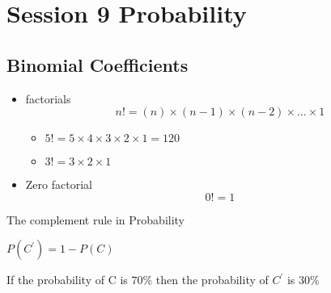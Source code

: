 \documentclass{article}
\begin{document}
\section*{Session 9 Probability}
\subsection*{Binomial Coefficients}
\begin{itemize}
\item factorials 
\[ n! = (n)\times (n-1)\times(n-2) \times \ldots \times 1 \]
\begin{itemize}
\item $5! = 5 \times 4 \times 3 \times 2 \times 1 = 120 $
\item $3! = 3 \times 2 \times 1$
\end{itemize}
\item Zero factorial
\[ 0! =  1 \]
\end{itemize}


The complement rule in Probability

$P(C^{\prime}) = 1- P(C)$

 

If the probability of C is $70 \%$ then the probability of $C^{\prime}$ is $30\%$
\end{document}

